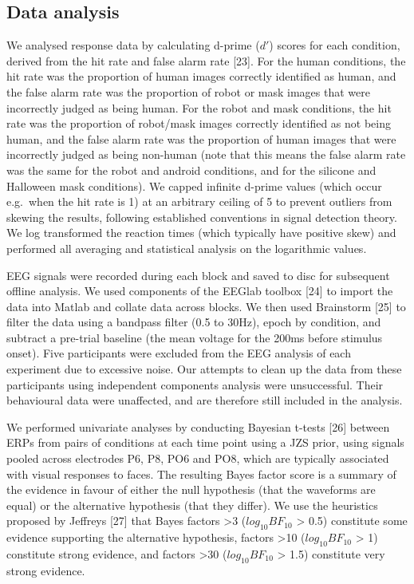 \documentclass[
]{article}
\begin{document}
\subsection{Data analysis}\label{data-analysis}

We analysed response data by calculating d-prime (\(d'\)) scores for each condition, derived from the hit rate and false alarm rate {[}23{]}. For the human conditions, the hit rate was the proportion of human images correctly identified as human, and the false alarm rate was the proportion of robot or mask images that were incorrectly judged as being human. For the robot and mask conditions, the hit rate was the proportion of robot/mask images correctly identified as not being human, and the false alarm rate was the proportion of human images that were incorrectly judged as being non-human (note that this means the false alarm rate was the same for the robot and android conditions, and for the silicone and Halloween mask conditions). We capped infinite d-prime values (which occur e.g.~when the hit rate is 1) at an arbitrary ceiling of 5 to prevent outliers from skewing the results, following established conventions in signal detection theory. We log transformed the reaction times (which typically have positive skew) and performed all averaging and statistical analysis on the logarithmic values.

EEG signals were recorded during each block and saved to disc for subsequent offline analysis. We used components of the EEGlab toolbox {[}24{]} to import the data into Matlab and collate data across blocks. We then used Brainstorm {[}25{]} to filter the data using a bandpass filter (0.5 to 30Hz), epoch by condition, and subtract a pre-trial baseline (the mean voltage for the 200ms before stimulus onset). Five participants were excluded from the EEG analysis of each experiment due to excessive noise. Our attempts to clean up the data from these participants using independent components analysis were unsuccessful. Their behavioural data were unaffected, and are therefore still included in the analysis.

We performed univariate analyses by conducting Bayesian t-tests {[}26{]} between ERPs from pairs of conditions at each time point using a JZS prior, using signals pooled across electrodes P6, P8, PO6 and PO8, which are typically associated with visual responses to faces. The resulting Bayes factor score is a summary of the evidence in favour of either the null hypothesis (that the waveforms are equal) or the alternative hypothesis (that they differ). We use the heuristics proposed by Jeffreys {[}27{]} that Bayes factors \textgreater3 (\(log_{10}BF_{10}\) \textgreater{} 0.5) constitute some evidence supporting the alternative hypothesis, factors \textgreater10 (\(log_{10}BF_{10}\) \textgreater{} 1) constitute strong evidence, and factors \textgreater30 (\(log_{10}BF_{10}\) \textgreater{} 1.5) constitute very strong evidence.
\end{document}
